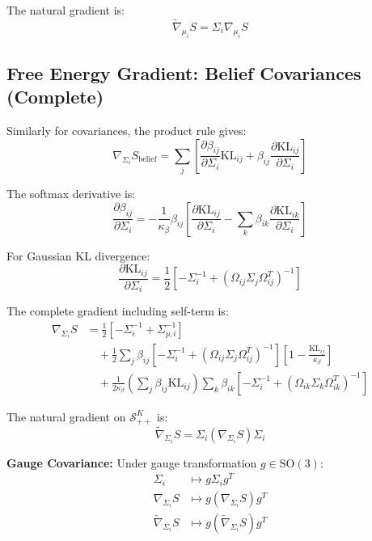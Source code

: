 \documentclass[11pt]{article}
\begin{document}
The natural gradient is:
\begin{equation}
\tilde{\nabla}_{\mu_i} S = \Sigma_i \nabla_{\mu_i} S
\end{equation}

\subsection*{Free Energy Gradient: Belief Covariances (Complete)}

Similarly for covariances, the product rule gives:
\begin{equation}
\nabla_{\Sigma_i} S_{\mathrm{belief}} = \sum_j \left[ \frac{\partial \beta_{ij}}{\partial \Sigma_i} \mathrm{KL}_{ij} + \beta_{ij} \frac{\partial \mathrm{KL}_{ij}}{\partial \Sigma_i} \right]
\end{equation}

The softmax derivative is:
\begin{equation}
\frac{\partial \beta_{ij}}{\partial \Sigma_i} = -\frac{1}{\kappa_\beta} \beta_{ij} \left[\frac{\partial \mathrm{KL}_{ij}}{\partial \Sigma_i} - \sum_k \beta_{ik} \frac{\partial \mathrm{KL}_{ik}}{\partial \Sigma_i}\right]
\end{equation}

For Gaussian KL divergence:
\begin{equation}
\frac{\partial \mathrm{KL}_{ij}}{\partial \Sigma_i} = \frac{1}{2}\left[-\Sigma_i^{-1} + (\Omega_{ij}\Sigma_j\Omega_{ij}^T)^{-1}\right]
\end{equation}

The complete gradient including self-term is:
\begin{align}
\nabla_{\Sigma_i} S &= \frac{1}{2}\left[-\Sigma_i^{-1} + \Sigma_{p,i}^{-1}\right] \nonumber \\
&\quad + \frac{1}{2}\sum_j \beta_{ij} \left[-\Sigma_i^{-1} + (\Omega_{ij}\Sigma_j\Omega_{ij}^T)^{-1}\right]\left[1 - \frac{\mathrm{KL}_{ij}}{\kappa_\beta}\right] \nonumber \\
&\quad + \frac{1}{2\kappa_\beta}\left(\sum_j \beta_{ij}\mathrm{KL}_{ij}\right) \sum_k \beta_{ik} \left[-\Sigma_i^{-1} + (\Omega_{ik}\Sigma_k\Omega_{ik}^T)^{-1}\right]
\end{align}

The natural gradient on $\mathcal{S}_{++}^K$ is:
\begin{equation}
\tilde{\nabla}_{\Sigma_i} S = \Sigma_i (\nabla_{\Sigma_i} S) \Sigma_i
\end{equation}

\textbf{Gauge Covariance:} Under gauge transformation $g \in \mathrm{SO}(3)$:
\begin{align}
\Sigma_i &\mapsto g\Sigma_i g^T \\
\nabla_{\Sigma_i} S &\mapsto g(\nabla_{\Sigma_i} S)g^T \\
\tilde{\nabla}_{\Sigma_i} S &\mapsto g(\tilde{\nabla}_{\Sigma_i} S)g^T
\end{align}
\end{document}
